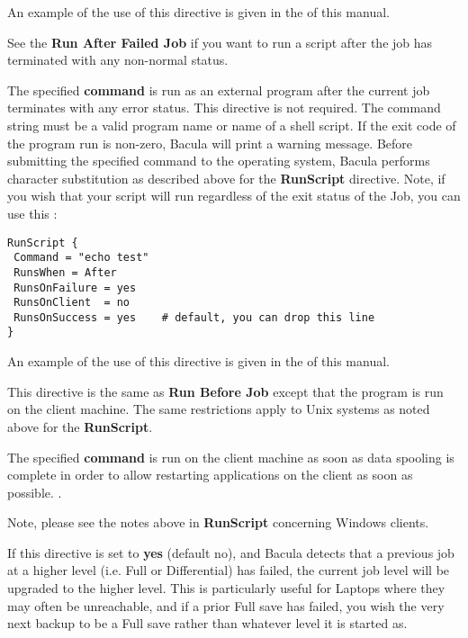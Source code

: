 \begin{description}
   An example of the use of this directive is given in the  
    of this manual.  

   See the {\bf Run After Failed Job} if you
   want to run a script after the job has terminated with any
   non-normal status.

\item [Run After Failed Job = \lt{}command\gt{}]
   The specified {\bf command} is run as an external program after the current
   job terminates with any error status.  This directive is not required.  The
   command string must be a valid program name or name of a shell script. If
   the exit code of the program run is non-zero, Bacula will print a
   warning message. Before submitting the specified command to the
   operating system, Bacula performs character substitution as described above
   for the {\bf RunScript} directive. Note, if you wish that your script
   will run regardless of the exit status of the Job, you can use this :
\begin{verbatim}
RunScript {
 Command = "echo test"
 RunsWhen = After
 RunsOnFailure = yes
 RunsOnClient  = no
 RunsOnSuccess = yes    # default, you can drop this line
}
\end{verbatim}

   An example of the use of this directive is given in the  
    of this manual.
  

\item [Client Run Before Job = \lt{}command\gt{}]
   This directive is the same as {\bf Run Before Job} except that the
   program is run on the client machine.  The same restrictions apply to
   Unix systems as noted above for the {\bf RunScript}.

\item [Client Run After Job = \lt{}command\gt{}]
   The specified {\bf command} is run on the client machine as soon
   as data spooling is complete in order to allow restarting applications
   on the client as soon as possible. .

   Note, please see the notes above in {\bf RunScript} 
   concerning Windows clients.

\item [Rerun Failed Levels = \lt{}yes\vb{}no\gt{}]
   If this directive is set to {\bf yes} (default no), and Bacula detects that
   a previous job at a higher level (i.e.  Full or Differential) has failed,
   the current job level will be upgraded to the higher level.  This is
   particularly useful for Laptops where they may often be unreachable, and if
   a prior Full save has failed, you wish the very next backup to be a Full
   save rather than whatever level it is started as.


\end{description}
